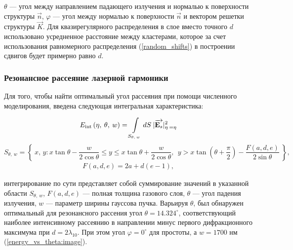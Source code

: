 
 $\theta$ --- угол между направлением падающего излучения и нормалью к поверхности структуры $\vec{n}$, $\varphi$ --- угол между нормалью к поверхности $\vec{n}$ и вектором решетки структуры $\vec{K}$. Для квазирегулярного распределения в слое вместо точного $d$ использовано усредненное расстояние между кластерами, которое за счет использования равномерного распределения (\autoref{random_shifts}) в построении сдвигов будет примерно равно $d$.



\subsubsection{Резонансное рассеяние лазерной гармоники}

Для того, чтобы найти оптимальный угол рассеяния при помощи численного моделирования, введена следующая интегральная характеристика:

    \begin{align}
        E_{\textrm{int}} \left(\eta,\:\theta,\:w \right) = \int \limits_{S_{\theta, \:w}} dS\:|\overrightarrow{\textbf{E}_{s}}|^2_{\eta \:= \eta}
        \label{e_int}
    \end{align}
    \begin{equation}
        S_{\theta, \:w} = \left\{\:x,\,y : x\tan{\theta} - \frac{w}{2\cos{\theta}} \leq y \leq x\tan{\theta} + \frac{w}{2\cos{\theta}},\:\: y > x\tan(\theta + \frac{\pi}{2}) - \frac{F\left(a, d, e\right)}{2\sin{\theta}}\:\right\},
        \label{S_for_e_int}
    \end{equation}
    \begin{align*}
        F\left(a, d, e\right) = 2a + d(e - 1),
    \end{align*}

 интегрирование по сути представляет собой суммирование значений в указанной области $S_{\theta, \:w}$, $F\left(a, d, e\right)$ --- полная толщина газового слоя, $\theta$ --- угол падения излучения, $w$ --- параметр ширины гауссова пучка. Варьируя $\theta$, был обнаружен оптимальный для резонансного рассения угол $\theta = 14.324^{\circ}$, соответствующий наиболее интенсивному рассеянию в направлении минус первого дифракционного максимума при $d = 2\lambda_{10}$. При этом угол $\varphi = 0^{\circ}$ для простоты, а $w = 1700$ нм (\autoref{energy_vs_theta:image}).


